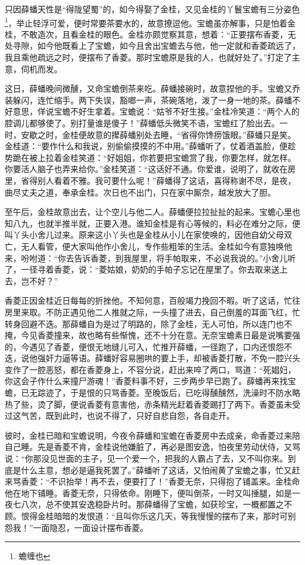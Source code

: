 \documentclass[12pt,oneside]{book}
\begin{document}
只因薛蟠天性是“得陇望蜀”的，如今得娶了金桂，又见金桂的丫鬟宝蟾有三分姿色\footnote{蟾缠也}，举止轻浮可爱，便时常要茶要水的，故意撩逗他。宝蟾虽亦解事，只是怕着金桂，不敢造次，且看金桂的眼色。金桂亦颇觉察其意，想着：“正要摆布香菱，无处寻隙，如今他既看上了宝蟾，如今且舍出宝蟾去与他，他一定就和香菱疏远了，我且乘他疏远之时，便摆布了香菱。那时宝蟾原是我的人，也就好处了。”打定了主意，伺机而发。

这日，薛蟠晚间微醺，又命宝蟾倒茶来吃。薛蟠接碗时，故意捏他的手。宝蟾又乔装躲闪，连忙缩手。两下失误，豁啷一声，茶碗落地，泼了一身一地的茶。薛蟠不好意思，佯说宝蟾不好生拿着。宝蟾说：“姑爷不好生接。”金桂冷笑道：“两个人的腔调儿都够使了。别打量谁是傻子！”薛蟠低头微笑不语，宝蟾红了脸出去。一时，安歇之时，金桂便故意的撵薛蟠别处去睡，“省得你馋痨饿眼。”薛蟠只是笑。金桂道：“要作什么和我说，别偷偷摸摸的不中用。”薛蟠听了，仗着酒盖脸，便趁势跪在被上拉着金桂笑道：“好姐姐，你若要把宝蟾赏了我，你要怎样，就怎样。你要活人脑子也弄来给你。”金桂笑道：“这话好不通。你爱谁，说明了，就收在房里，省得别人看着不雅。我可要什么呢！”薛蟠得了这话，喜得称谢不尽，是夜，曲尽丈夫之道，奉承金桂。次日也不出门，只在家中厮奈，越发放大了胆。

至午后，金桂故意出去，让个空儿与他二人。薛蟠便拉拉扯扯的起来。宝蟾心里也知八九，也就半推半就，正要入港。谁知金桂是有心等候的，料必在难分之际，便叫丫头小舍儿过来。原来这小丫头也是金桂从小儿在家使唤的，因他自幼父母双亡，无人看管，便大家叫他作小舍儿，专作些粗笨的生活。金桂如今有意独唤他来，吩咐道：“你去告诉香菱，到我屋里，将手帕取来，不必说我说的。”小舍儿听了，一径寻着香菱，说：“菱姑娘，奶奶的手帕子忘记在屋里了。你去取来送上去，岂不好？”

香菱正因金桂近日每每的折挫他。不知何意，百般竭力挽回不暇。听了这话，忙往房里来取。不防正遇见他二人推就之际，一头撞了进去，自己倒羞的耳面飞红，忙转身回避不迭。那薛蟠自为是过了明路的，除了金桂，无人可怕，所以连门也不掩，今见香菱撞来，故也略有些惭愧，还不十分在意。无奈宝蟾素日最是说嘴要强的，今遇见了香菱，便恨无地缝儿可入，忙推开薛蟠，一径跑了，口内还恨怨不迭，说他强奸力逼等语。薛蟠好容易圈哄的要上手，却被香菱打散，不免一腔兴头变作了一腔恶怒，都在香菱身上，不容分说，赶出来啐了两口，骂道：“死娼妇，你这会子作什么来撞尸游魂！”香菱料事不好，三步两步早已跑了。薛蟠再来找宝蟾，已无踪迹了，于是恨的只骂香菱。至晚饭后，已吃得醺醺然，洗澡时不防水略热了些，烫了脚，便说香菱有意害他，赤条精光赶着香菱踢打了两下。香菱虽未受过这气苦，既到此时，也说不得了，只好自悲自怨，各自走开。

彼时，金桂已暗和宝蟾说明，今夜令薛蟠和宝蟾在香菱房中去成亲，命香菱过来陪自己睡。先是香菱不肯，金桂说他嫌脏了，再必是图安逸，怕夜里劳动伏侍，又骂说：“你那没见世面的主子，见一个爱一个，把我的人霸占了去，又不叫你来。到底是什么主意，想必是逼我死罢了。”薛蟠听了这话，又怕闹黄了宝蟾之事，忙又赶来骂香菱：“不识抬举！再不去，便要打了！”香菱无奈，只得抱了铺盖来。金桂命他在地下铺睡。香菱无奈，只得依命。刚睡下，便叫倒茶，一时又叫捶腿，如是一夜七八次，总不使其安逸稳卧片时。那薛蟠得了宝蟾，如获珍宝，一概都置之不顾。恨得金桂暗暗的发恨道：“且叫你乐这几天，等我慢慢的摆布了来，那时可别怨我！”一面隐忍，一面设计摆布香菱。
\end{document}
